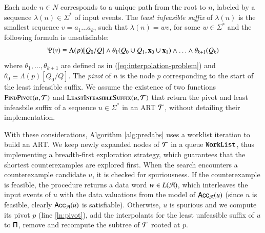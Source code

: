 \documentclass[10pt]{llncs}
\begin{document}

Each node $n \in N$ corresponds to a unique path from the root to $n$,
labeled by a sequence $\lambda(n) \in \Sigma^*$ of input events. The
\emph{least infeasible suffix} of $\lambda(n)$ is the smallest
sequence $v = a_1 \ldots a_k$, such that $\lambda(n) = wv$, for some
$w \in \Sigma^*$ and the following formula is unsatisfiable:
\begin{equation}\label{eq:pivot}
  \Psi(v) \equiv \Lambda(p)[Q_0/Q] \wedge
  \theta_1(Q_0 \cup Q_1,\mathbf x_0 \cup \mathbf x_1) \wedge \ldots \wedge
  \theta_{k+1}(Q_k)
\end{equation}
where $\theta_1,\ldots,\theta_{k+1}$ are defined as in
(\ref{eq:interpolation-problem}) and $\theta_0 \equiv
\Lambda(p)[Q_0/Q]$. The \emph{pivot} of $n$ is the node $p$
corresponding to the start of the least infeasible suffix.  We assume
the existence of two functions $\Call{FindPivot}{u,\Art}$ and
$\Call{LeastInfeasibleSuffix}{u,\Art}$ that return the pivot and least
infeasbile suffix of a sequence $u \in \Sigma^*$ in an ART $\mathcal{T}$,
without detailing their implementation. 

With these considerations, Algorithm \ref{alg:predabs} uses a worklist
iteration to build an ART. We keep newly expanded nodes of $\mathcal{T}$ in a
queue $\mathtt{WorkList}$, thus implementing a breadth-first exploration
strategy, which guarantees that the shortest counterexamples are
explored first. When the search encounters a counterexample candidate
$u$, it is checked for spuriousness. If the counterexample is
feasible, the procedure returns a data word $w \in L(\mathcal{A})$, which
interleaves the input events of $u$ with the data valuations from the
model of $\mathsf{Acc}_{\mathcal{A}}(u)$ (since $u$ is feasible, clearly
$\mathsf{Acc}_{\mathcal{A}}(u)$ is satisfiable). Otherwise, $u$ is spurious and we
compute its pivot $p$ (line \ref{ln:pivot}), add the interpolants for
the least unfeasible suffix of $u$ to $\mathsf{\Pi}$, remove and recompute
the subtree of $\mathcal{T}$ rooted at $p$.
\end{document}
